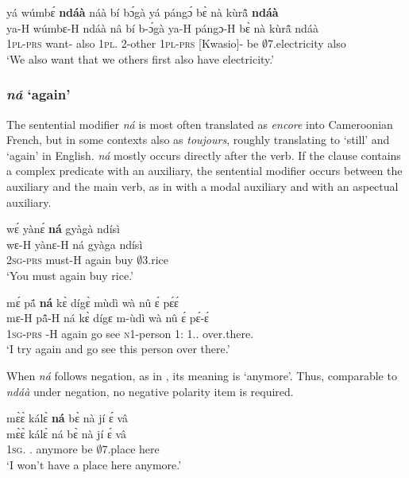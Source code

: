 \ea \label{ndaa4}
  \glll  yá wúmbɛ́ {\bfseries ndáà} náà bí bɔ́gà yá pángɔ́ bɛ̀ nà kùrã̂ {\bfseries ndáà} \\
         ya-H wúmbɛ-H ndáà nâ bí b-ɔ́gà ya-H pángɔ-H bɛ̀ nà kùrã̂ ndáà \\
        1\textsc{pl}-\textsc{prs} want-{\R} also {\COMP} 1\textsc{pl}.{\SBJ} 2-other 1\textsc{pl}-\textsc{prs}  {\PRIOR}[Kwasio]-{\R} be  {\COM} $\emptyset$7.electricity also\\
    \trans `We also want that we others first also have electricity.'
\z


\subsubsection*{{\itshape ná}  `again'}
The sentential modifier {\itshape ná} is
most often translated as {\itshape encore} into Cameroonian French, but in some contexts also as {\itshape toujours}, roughly translating to `still' and `again' in English. {\itshape ná} mostly occurs directly after the verb. If the clause contains a complex predicate with an auxiliary, the sentential modifier occurs between the auxiliary and the main verb, as in  with a modal auxiliary and  with an aspectual auxiliary.

\ea \label{na1}
  \glll  wɛ́ yànɛ́ {\bfseries ná} gyàgà ndísì \\
     wɛ-H yànɛ-H ná gyàga ndísì \\
        2\textsc{sg}-\textsc{prs} must-H again buy $\emptyset$3.rice\\
    \trans `You must again buy rice.'
\z

\ea \label{na2}
  \glll mɛ́ pã́ {\bfseries ná} kɛ̀ dígɛ̀ mùdì wà nû ɛ́ pɛ́ɛ́\\
        mɛ-H pã̂-H ná kɛ̀ dígɛ m-ùdì wà nû ɛ́ pɛ́-ɛ́ \\
        1\textsc{sg}-\textsc{prs} {\PRIOR}-H again go see \textsc{n}1-person 1:{\ATT} 1.{\DEM}.{\PROX} {\LOC} over.there.{\DIST} \\
    \trans `I try again and go see this person over there.'
\z

When {\itshape ná} follows negation, as in , its meaning is `anymore'. Thus, comparable to {\itshape ndáà} under negation, no negative polarity item is required.

\ea \label{na3}
  \glll  mɛ̀ɛ̀ kálɛ̀ {\bfseries ná} bɛ̀ nà jí ɛ́ vâ \\
        mɛ̀ɛ̀ kálɛ̀ ná bɛ̀ nà jí ɛ́ vâ \\
           1\textsc{sg}.{\FUT} {\NEG}.{\FUT} anymore be {\COM} $\emptyset$7.place {\LOC} here\\
    \trans `I won't have a place here anymore.'
\z


